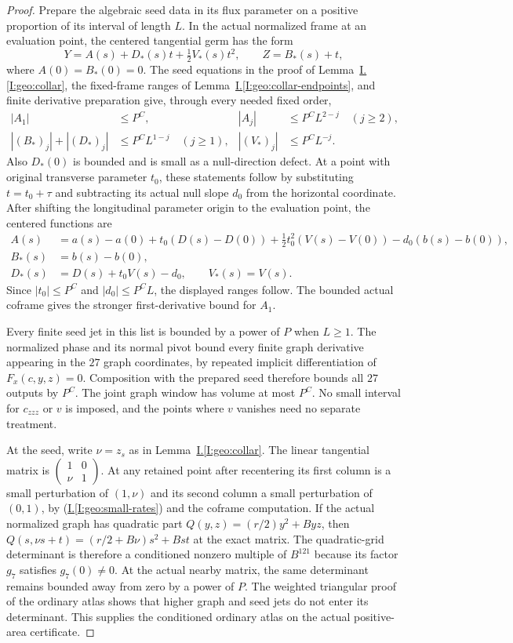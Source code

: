 \documentclass[11pt]{amsart}
\theoremstyle{definition}
\theoremstyle{remark}
\numberwithin{equation}{section}
\newcommand{\partIref}[1]{\hyperref[I:#1]{I.\ref*{I:#1}}}
\newcommand{\partIeqref}[1]{\textup{(\partIref{#1})}}
\begin{document}
\begin{proof}
Prepare the algebraic seed data in its flux parameter on a positive proportion of its interval of length $L$. In the actual normalized frame at an evaluation point, the centered tangential germ has the form
\[
Y=A(s)+D_*(s)t+\tfrac12V_*(s)t^2,\qquad Z=B_*(s)+t,
\]
where $A(0)=B_*(0)=0$. The seed equations in the proof of Lemma~\partIref{geo:collar}, the fixed-frame ranges of Lemma~\partIref{geo:collar-endpoints}, and finite derivative preparation give, through every needed fixed order,
\[
\begin{aligned}
|A_1|&\le P^C,& |A_j|&\le P^CL^{2-j}\quad(j\ge2),\\
|(B_*)_j|+|(D_*)_j|&\le P^CL^{1-j}\quad(j\ge1),& |(V_*)_j|&\le P^CL^{-j}.
\end{aligned}
\]
Also $D_*(0)$ is bounded and is small as a null-direction defect. At a point with original transverse parameter $t_0$, these statements follow by substituting $t=t_0+\tau$ and subtracting its actual null slope $d_0$ from the horizontal coordinate. After shifting the longitudinal parameter origin to the evaluation point, the centered functions are
\[
\begin{aligned}
A(s)&=a(s)-a(0)+t_0(D(s)-D(0))+\tfrac12t_0^2(V(s)-V(0))-d_0(b(s)-b(0)),\\
B_*(s)&=b(s)-b(0),\\
D_*(s)&=D(s)+t_0V(s)-d_0,\qquad V_*(s)=V(s).
\end{aligned}
\]
Since $|t_0|\le P^C$ and $|d_0|\le P^CL$, the displayed ranges follow. The bounded actual coframe gives the stronger first-derivative bound for $A_1$.

Every finite seed jet in this list is bounded by a power of $P$ when $L\ge1$. The normalized phase and its normal pivot bound every finite graph derivative appearing in the $27$ graph coordinates, by repeated implicit differentiation of $F_x(c,y,z)=0$. Composition with the prepared seed therefore bounds all $27$ outputs by $P^C$. The joint graph window has volume at most $P^C$. No small interval for $c_{zzz}$ or $v$ is imposed, and the points where $v$ vanishes need no separate treatment.

At the seed, write $\nu=z_s$ as in Lemma~\partIref{geo:collar}. The linear tangential matrix is $\left(\begin{smallmatrix}1&0\\\nu&1\end{smallmatrix}\right)$. At any retained point after recentering its first column is a small perturbation of $(1,\nu)$ and its second column a small perturbation of $(0,1)$, by \partIeqref{geo:small-rates} and the coframe computation. If the actual normalized graph has quadratic part $Q(y,z)=(r/2)y^2+Byz$, then $Q(s,\nu s+t)=(r/2+B\nu)s^2+Bst$ at the exact matrix. The quadratic-grid determinant is therefore a conditioned nonzero multiple of $B^{121}$ because its factor $g_7$ satisfies $g_7(0)\ne0$. At the actual nearby matrix, the same determinant remains bounded away from zero by a power of $P$. The weighted triangular proof of the ordinary atlas shows that higher graph and seed jets do not enter its determinant. This supplies the conditioned ordinary atlas on the actual positive-area certificate.


\end{proof}
\end{document}
